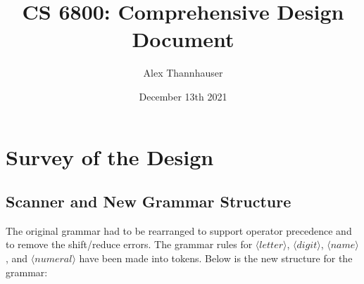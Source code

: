 \documentclass[letterpaper,11pt]{article}
\begin{document}
{
	\title{CS 6800: Comprehensive Design Document}
	\author{Alex Thannhauser}
	\date{December 13th 2021}

	\maketitle
	
	\section{Survey of the Design}
	{
		\subsection{Scanner and New Grammar Structure}
		{
			The original grammar had to be rearranged to support operator
			precedence and to remove the shift/reduce errors. The grammar rules
			for $\langle letter \rangle$, $\langle digit \rangle$,
			$\langle name \rangle$, and $\langle numeral \rangle$ have been made
			into tokens. Below is the new structure for the grammar:
			
}}}
\end{document}
